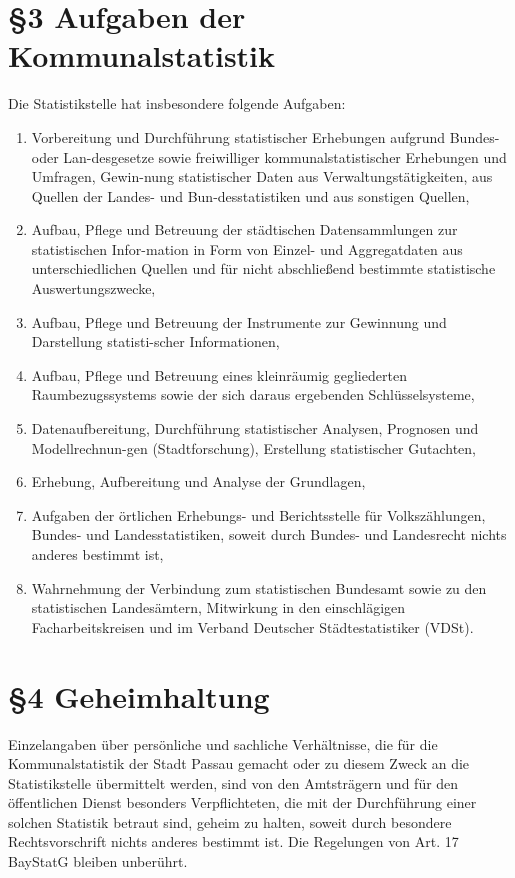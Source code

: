 \documentclass[A4, 12pt]{scrbook}
\begin{document}
 \section{\S3 Aufgaben der Kommunalstatistik}
 Die Statistikstelle hat insbesondere folgende Aufgaben:
  \begin{enumerate}[label=\arabic*.]
    \item Vorbereitung und Durchführung statistischer Erhebungen aufgrund Bundes- oder Lan-desgesetze sowie freiwilliger kommunalstatistischer Erhebungen und Umfragen, Gewin-nung statistischer Daten aus Verwaltungstätigkeiten, aus Quellen der Landes- und Bun-desstatistiken und aus sonstigen Quellen, 
    \item Aufbau, Pflege und Betreuung der städtischen Datensammlungen zur statistischen Infor-mation in Form von Einzel- und Aggregatdaten aus unterschiedlichen Quellen und für nicht abschließend bestimmte statistische Auswertungszwecke, 
    \item Aufbau, Pflege und Betreuung der Instrumente zur Gewinnung und Darstellung statisti-scher Informationen,
    \item Aufbau, Pflege und Betreuung eines kleinräumig gegliederten Raumbezugssystems sowie der sich daraus ergebenden Schlüsselsysteme,
    \item Datenaufbereitung, Durchführung statistischer Analysen, Prognosen und Modellrechnun-gen (Stadtforschung), Erstellung statistischer Gutachten, 
    \item Erhebung, Aufbereitung und Analyse der Grundlagen, 
    \item Aufgaben der örtlichen Erhebungs- und Berichtsstelle für Volkszählungen, Bundes- und Landesstatistiken, soweit durch Bundes- und Landesrecht nichts anderes bestimmt ist,
    \item Wahrnehmung der Verbindung zum statistischen Bundesamt sowie zu den statistischen Landesämtern, Mitwirkung in den einschlägigen Facharbeitskreisen und im Verband Deutscher Städtestatistiker (VDSt).
  \end{enumerate} 
  \section{\S4 Geheimhaltung}
    Einzelangaben über persönliche und sachliche Verhältnisse, die für die Kommunalstatistik der Stadt Passau gemacht oder zu diesem Zweck an die Statistikstelle übermittelt werden, sind von den Amtsträgern und für den öffentlichen Dienst besonders Verpflichteten, die mit der Durchführung einer solchen Statistik betraut sind, geheim zu halten, soweit durch besondere Rechtsvorschrift nichts anderes bestimmt ist. Die Regelungen von Art. 17 BayStatG bleiben unberührt.
    
\end{document}
